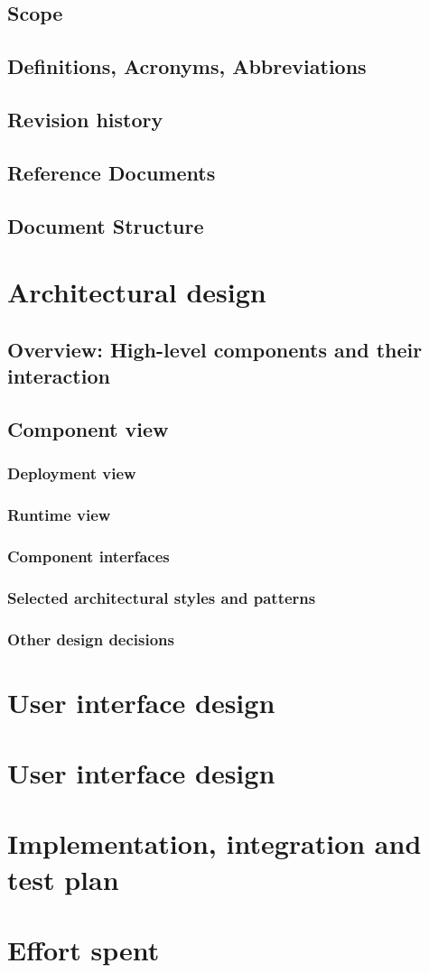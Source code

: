 \documentclass{article}
\begin{document}
\subsection{Scope}
\subsection{Definitions, Acronyms, Abbreviations}
\subsection{Revision history}
\subsection{Reference Documents}
\subsection{Document Structure}

\section{Architectural design}
\subsection{Overview: High-level components and their interaction}
\subsection{Component view}
\subsubsection{Deployment view}
\subsubsection{Runtime view}
\subsubsection{Component interfaces}
\subsubsection{Selected	architectural	styles	and	patterns}
\subsubsection{Other	design	decisions}

\section{User interface design}

\section{User interface design}

\section{Implementation, integration and test plan}

\section{Effort spent}
\end{document}
